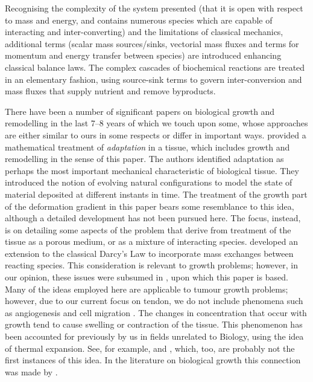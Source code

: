 Recognising the complexity of the system presented (that it is open
with respect to mass and energy, and contains numerous species which
are capable of interacting and inter-converting) and the limitations
of classical  mechanics, additional terms (scalar mass sources/sinks,
vectorial mass fluxes and terms for momentum and energy transfer
between species) are introduced enhancing classical balance laws. The
complex cascades of biochemical reactions are treated in an elementary
fashion, using source-sink terms to govern inter-conversion and mass
fluxes that supply nutrient and remove byproducts.

There have been a number of significant papers on biological growth
and remodelling in the last 7--8 years of which we touch upon some,
whose approaches are either similar to ours in some respects or differ
in important ways. \citet{HumphreyRajagopal:02} provided a
mathematical treatment of \emph{adaptation} in a tissue, which includes 
growth and remodelling in the sense of this paper. The authors
identified adaptation as perhaps the most important mechanical
characteristic of biological tissue. They introduced the notion of evolving
natural configurations to model the state of material deposited at
different instants in time. The treatment of the growth part of the
deformation gradient in this paper bears some resemblance to this
idea, although a detailed development has not been pursued here. The
focus, instead, is on detailing some aspects of the problem that
derive from treatment of the tissue as a porous medium, or as a
mixture of interacting species. \citet{PreziosiFarina:2002} developed an
extension to the classical Darcy's Law to incorporate mass exchanges
between reacting species. This consideration is relevant to growth
problems; however, in our opinion, these issues were subsumed in
\citet{growthpaper}, upon which this paper is based. Many of the ideas
employed here are applicable to tumour growth problems; however, due
to our current focus on tendon, we do not include phenomena
such as angiogenesis and cell migration \citep[see for
  example][]{Brewardetal:2003}. The changes in concentration that
occur with growth tend to cause swelling or contraction of the
tissue. This phenomenon has been accounted for previously by us in fields unrelated to
Biology, using the idea of thermal expansion. See, for
example, \citet{Rao2:00} and \citet{Garikipatietal:01}, which, too,
are probably not the first instances of this idea. In the literature
on biological 
growth this connection was made by \citet{KlischHoger:2003}.

